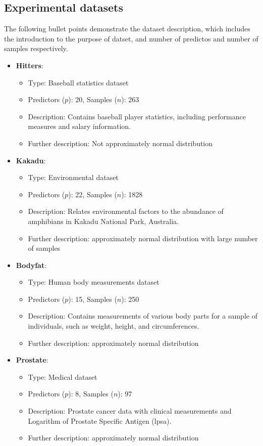 \subsection{Experimental datasets}
The following bullet points demonstrate the dataset description, which includes the introduction to the purpose of datset, and number of predictos and number of samples respectively.
\begin{itemize}
	
	\item \textbf{Hitters}:
	\begin{itemize}
		\item Type: Baseball statistics dataset
		\item Predictors ($p$): 20, Samples ($n$): 263
		\item Description: Contains baseball player statistics, including performance measures and salary information.
		\item Further description: Not approximately normal distribution
	\end{itemize}
	
	\item \textbf{Kakadu}:
	\begin{itemize}
		\item Type: Environmental dataset
		\item Predictors ($p$): 22, Samples ($n$): 1828
		\item Description: Relates environmental factors to the abundance of amphibians in Kakadu National Park, Australia.
		\item Further description: approximately normal distribution with large number of samples
	\end{itemize}
	
	\item \textbf{Bodyfat}:
	\begin{itemize}
		\item Type: Human body measurements dataset
		\item Predictors ($p$): 15, Samples ($n$): 250
		\item Description: Contains measurements of various body parts for a sample of individuals, such as weight, height, and circumferences.
		\item Further description: approximately normal distribution
	\end{itemize}
	\item \textbf{Prostate}:
	\begin{itemize}
		\item Type: Medical dataset
		\item Predictors ($p$): 8, Samples ($n$): 97
		\item Description: Prostate cancer data with clinical measurements and Logarithm of Prostate Specific Antigen (lpsa).
		\item Further description: approximately normal distribution
	\end{itemize}
	

\end{itemize}
